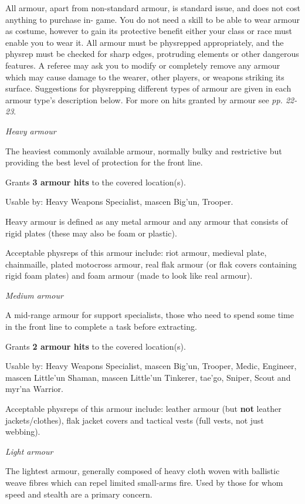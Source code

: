 \documentclass{scrbook}
\begin{document}
All armour, apart from non-standard armour, is standard issue, and does not cost anything to purchase in- game. You do not need a skill to be able to wear armour as costume, however to gain its protective benefit either your class or race must enable you to wear it. All armour must be physrepped appropriately, and the physrep must be checked for sharp edges, protruding elements or other dangerous features. A referee may ask you to modify or completely remove any armour which may cause damage to the wearer, other players, or weapons striking its surface. Suggestions for physrepping different types of armour are given in each armour type's description below. For more on hits granted by armour see \textit{pp. 22-23}.

\textit{Heavy armour}

The heaviest commonly available armour, normally bulky and restrictive but providing the best level of protection for the front line.

Grants \textbf{3 armour hits} to the covered location(s).

Usable by: Heavy Weapons Specialist, mascen Big'un, Trooper.

Heavy armour is defined as any metal armour and any armour that consists of rigid plates (these may also be foam or plastic).

Acceptable physreps of this armour include: riot armour, medieval plate, chainmaille, plated motocross armour, real flak armour (or flak covers containing rigid foam plates) and foam armour (made to look like real armour).

\textit{Medium armour}

A mid-range armour for support specialists, those who need to spend some time in the front line to complete a task before extracting.

Grants \textbf{2 armour hits} to the covered location(s).

Usable by: Heavy Weapons Specialist, mascen Big'un, Trooper, Medic, Engineer, mascen Little'un Shaman, mascen Little'un Tinkerer, tae'go, Sniper, Scout and myr'na Warrior.

Acceptable physreps of this armour include: leather armour (but \textbf{not} leather jackets/clothes), flak jacket covers and tactical vests (full vests, not just webbing).

\textit{Light armour}

The lightest armour, generally composed of heavy cloth woven with ballistic weave fibres which can repel limited small-arms fire. Used by those for whom speed and stealth are a primary concern.
\end{document}
